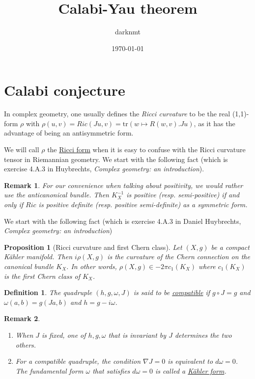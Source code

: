 \documentclass[11pt]{article}
\author{darknmt}
\date{\today}
\title{Calabi-Yau theorem}
\newtheorem{remark}{Remark}
\newtheorem{proposition}{Proposition}[theorem]
\newtheorem{definition}{Definition}
\begin{document}
\maketitle
\tableofcontents


\section{Calabi conjecture}
\label{sec:org63f7219}

In complex geometry, one usually defines the \emph{Ricci curvature} to be the real (1,1)-form \(\rho\)
with \(\rho(u,v) = Ric(Ju, v) = \text{tr}(w \mapsto R(w,v).Ju)\), as it has the advantage of being an
antisymmetric form.

We will call \(\rho\) the \uline{Ricci form} when it is easy to confuse with the Ricci
curvature tensor in Riemannian geometry. We start with the following fact (which is exercise 4.A.3
in Huybrechts, \emph{Complex geometry: an introduction}).

\begin{remark}
For our convenience when talking about positivity, we would rather use the anticanonical
bundle. Then \(K_{X}^{-1}\) is positive (resp. semi-positive) if and only if \(Ric\) is positive
definite (resp. positive semi-definite) as a symmetric form.
\end{remark}



We start with the following fact (which is exercise 4.A.3 in Daniel Huybrechts, \emph{Complex geometry: an introduction})

\begin{proposition}[Ricci curvature and first Chern class]
Let \((X,g)\) be a compact Kähler manifold. Then \(i\rho(X,g)\) is the curvature of the Chern connection
on the canonical bundle \(K_X\). In other words, \(\rho(X,g)\in -2\pi c_1(K_X)\) where
\(c_1(K_X)\) is the first Chern class of \(K_X\).
\end{proposition}


\begin{definition}
The quadruple \((h, g, \omega, J)\) is said to be \uline{compatible} if \(g\circ J = g\) and \(\omega(a,b) =
g(Ja,b)\) and \(h = g - i\omega\). 
\end{definition}

\begin{remark}
\begin{enumerate}
\item When \(J\) is fixed, one of \(h,g,\omega\) that is invariant by \(J\) determines the two others.
\item For a compatible quadruple, the condition \(\nabla J = 0\) is equivalent to \(d\omega = 0\). The
fundamental form \(\omega\) that satisfies \(d\omega = 0\) is called a \uline{Kähler form}.
\end{enumerate}
\end{remark}
\end{document}
